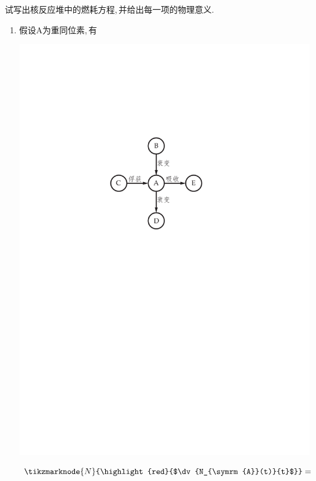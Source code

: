 \begin{exercise}
    试写出核反应堆中的燃耗方程,\,并给出每一项的物理意义.\,
    \begin{solution}
        \begin{enumerate}[(1)]
            \item 假设A为重同位素,\,有
            
            \vspace{1em}
            \begin{minipage}{0.1\columnwidth}
                \includegraphics[scale=0.6]{figures/fig6.1.pdf}
            \end{minipage}
            \hfil
            \begin{minipage}{0.85\columnwidth}
                \begin{equation*}
                    \tikzmarknode{N}{\highlight{red}{$\dv{N_{\symrm{A}}(t)}{t}$}} =

\end{equation*}
\end{minipage}
\end{enumerate}
\end{solution}
\end{exercise}
